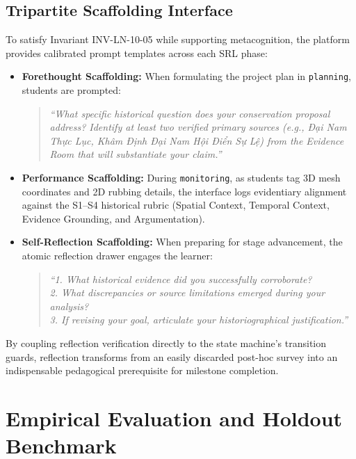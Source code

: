 \documentclass[11pt,a4paper]{article}
\begin{document}
\subsection{Tripartite Scaffolding Interface}
To satisfy Invariant INV-LN-10-05 while supporting metacognition, the platform provides calibrated prompt templates across each SRL phase:
\begin{itemize}
    \item \textbf{Forethought Scaffolding:}
    When formulating the project plan in \texttt{planning}, students are prompted:
    \begin{quote}
    \textit{``What specific historical question does your conservation proposal address? Identify at least two verified primary sources (e.g., Đại Nam Thực Lục, Khâm Định Đại Nam Hội Điển Sự Lệ) from the Evidence Room that will substantiate your claim.''}
    \end{quote}
    \item \textbf{Performance Scaffolding:}
    During \texttt{monitoring}, as students tag 3D mesh coordinates and 2D rubbing details, the interface logs evidentiary alignment against the S1--S4 historical rubric (Spatial Context, Temporal Context, Evidence Grounding, and Argumentation).
    \item \textbf{Self-Reflection Scaffolding:}
    When preparing for stage advancement, the atomic reflection drawer engages the learner:
    \begin{quote}
    \textit{``1. What historical evidence did you successfully corroborate?\\
    2. What discrepancies or source limitations emerged during your analysis?\\
    3. If revising your goal, articulate your historiographical justification.''}
    \end{quote}
\end{itemize}

By coupling reflection verification directly to the state machine's transition guards, reflection transforms from an easily discarded post-hoc survey into an indispensable pedagogical prerequisite for milestone completion.

\section{Empirical Evaluation and Holdout Benchmark}
\end{document}

